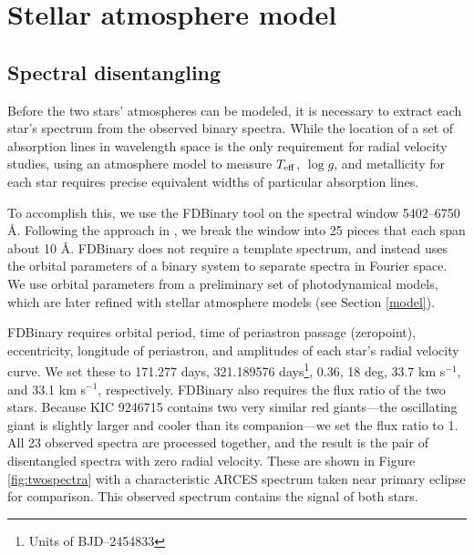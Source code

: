 \section{Stellar atmosphere model}\label{atm}

\subsection{Spectral disentangling}\label{disentangle}
Before the two stars' atmospheres can be modeled, it is necessary to extract each star's spectrum from the observed binary spectra. While the location of a set of absorption lines in wavelength space is the only requirement for radial velocity studies, using an atmosphere model to measure $T_{\rm{eff}}$, $\log g$, and metallicity for each star requires precise equivalent widths of particular absorption lines.

To accomplish this, we use the FDBinary tool \citep{ili04} on the spectral window 5402--6750 \AA. Following the approach in \citet{bec14}, we break the window into 25 pieces that each span about 10 \AA. FDBinary does not require a template spectrum, and instead uses the orbital parameters of a binary system to separate spectra in Fourier space. We use orbital parameters from a preliminary set of photodynamical models, which are later refined with stellar atmosphere models (see Section \ref{model}).

FDBinary requires orbital period, time of periastron passage (zeropoint), eccentricity, longitude of periastron, and amplitudes of each star's radial velocity curve. We set these to 171.277 days, 321.189576 days\footnote{Units of BJD--2454833}, 0.36, 18 deg, 33.7 km s$^{-1}$, and 33.1 km s$^{-1}$, respectively. FDBinary also requires the flux ratio of the two stars. Because KIC 9246715 contains two very similar red giants---the oscillating giant is slightly larger and cooler than its companion---we set the flux ratio to 1. All 23 observed spectra are processed together, and the result is the pair of disentangled spectra with zero radial velocity. These are shown in Figure \ref{fig:twospectra} with a characteristic ARCES spectrum taken near primary eclipse for comparison. This observed spectrum contains the signal of both stars.
